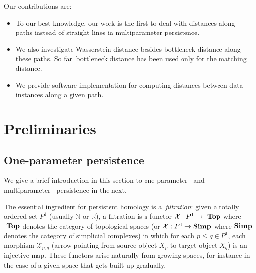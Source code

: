 \documentclass[sigconf, nonacm, natbib=false]{acmart} %
\def\X {{\mathcal{X}}}
\def\NN{{\mathbb{N}}}
\def\RR{{\mathbb{R}}}
\def\top{\bf~Top}
\def\simp{\bf Simp}
\let\svtodo\todo
\renewcommand\todo[1]{\svtodo[inline]{#1}}
\newcommand{\XS}[1]{\todo{XS:~#1}}
\theoremstyle{plain}
\begin{document}


Our contributions are:
\begin{itemize}
    \item To our best knowledge, our work is the first to deal with distances along paths instead of straight lines in multiparameter persistence. 
    \item We also investigate Wasserstein distance besides bottleneck distance along these paths. So far, bottleneck distance has been used only for the matching distance.
    \item We provide software implementation for computing distances between data instances along a given path.
\end{itemize}



\section{Preliminaries}\label{sec:preliminaries}
\subsection{One-parameter persistence}
We give a brief introduction in this section to one-parameter~\cite{ghrist2008barcodes} and multiparameter~\cite{botnan2022introduction} persistence in the next. 

The essential ingredient for persistent homology is a~\emph{filtration}: given a totally ordered set $P^1$ (usually $\NN$ or $\RR$), 
a filtration is a functor $\X:P^1\rightarrow\top$ where $\top$ denotes the category of topological spaces 
(or $\X:P^1\rightarrow\simp$ where $\simp$ denotes the category of simplicial complexes) 
in which for each $p\leq q\in P^1$, each morphism $\X_{p,q}$ (arrow pointing from source object $X_p$ to target object $X_q$) is an injective map. 
These functors arise naturally from growing spaces, for instance in the case of a given space that gets built up gradually.   
\end{document}

